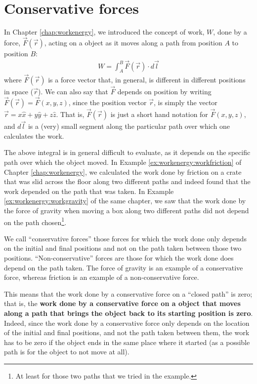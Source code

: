 \section{Conservative forces}
In Chapter \ref{chap:workenergy}, we introduced the concept of work, $W$, done by a force, $\vec F(\vec r)$, acting on a object as it moves along a path from position $A$ to position $B$:
\begin{align}
\label{eq:potentialecons:workdef}
W = \int_A^B \vec F(\vec r) \cdot d\vec l
\end{align}
where $\vec F(\vec r)$ is a force vector that, in general, is different in different positions in space ($\vec r$). We can also say that $\vec F$ depends on position by writing $\vec F(\vec r)=\vec F(x,y,z)$, since the position vector $\vec r$, is simply the vector $\vec r = x\hat x + y \hat y+ z\hat z$. That is, $\vec F(\vec r)$ is just a short hand notation for $\vec F(x,y,z)$, and $d\vec l$ is a (very) small segment along the particular path over which one calculates the work.

The above integral is in general difficult to evaluate, as it depends on the specific path over which the object moved. In Example \ref{ex:workenergy:workfriction} of Chapter \ref{chap:workenergy}, we calculated the work done by friction on a crate that was slid across the floor along two different paths and indeed found that the work depended on the path that was taken. In Example \ref{ex:workenergy:workgravity} of the same chapter, we saw that the work done by the force of gravity when moving a box along two different paths did not depend on the path chosen\footnote{At least for those two paths that we tried in the example.}.

We call ``conservative forces'' those forces for which the work done only depends on the initial and final positions and not on the path taken between those two positions. ``Non-conservative'' forces are those for which the work done does depend on the path taken. The force of gravity is an example of a conservative force, whereas friction is an example of a non-conservative force.

This means that the work done by a conservative force on a ``closed path'' is zero; that is, the \textbf{work done by a conservative force on a object that moves along a path that brings the object back to its starting position is zero}. Indeed, since the work done by a conservative force only depends on the location of the initial and final positions, and not the path taken between them, the work has to be zero if the object ends in the same place where it started (as a possible path is for the object to not move at all).

